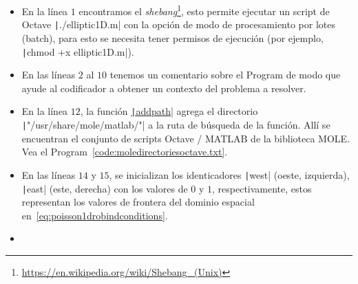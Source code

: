 \begin{itemize}
	\item

	      En la línea $1$ encontramos el
	      \emph{shebang}\footnote{\url{https://en.wikipedia.org/wiki/Shebang_(Unix)}},
	      esto permite ejecutar un script de Octave
	      \texttt|./elliptic1D.m| con la opción de modo de
	      procesamiento por lotes (batch), para esto se necesita
	      tener permisos de ejecución (por ejemplo,
	      \texttt|chmod +x elliptic1D.m|).

	\item

	      En las líneas $2$ al $10$ tenemos un comentario sobre el
	      Program de modo que ayude al codificador a obtener un
	      contexto del problema a resolver.

	\item

	      En la línea $12$, la función
	      \href{https://docs.octave.org/v9.3.0/Manipulating-the-Load-Path.html#index-addpath}{\texttt|addpath|}
	      agrega el directorio
	      \texttt|"/usr/share/mole/matlab/"| a la ruta de
	      búsqueda de la función.
	      Allí se encuentran el conjunto de scripts Octave / MATLAB
	      de la biblioteca MOLE.
	      Vea el Program~\ref{code:moledirectoriesoctave.txt}.

	\item

	      En las líneas $14$ y $15$, se inicializan los identicadores
	      \texttt|west| (oeste, izquierda),
	      \texttt|east| (este, derecha) con los valores
	      de $0$ y $1$, respectivamente, estos representan los
	      valores de frontera del dominio espacial
	      en~\eqref{eq:poisson1drobindconditions}.

	\item


\end{itemize}
